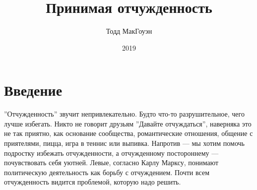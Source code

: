 \documentclass[11pt]{book}
\title{Принимая отчужденность}
\author{Тодд МакГоуэн}
\date{2019}
\begin{document}

\null
    \thispagestyle{empty}%
    \addtocounter{page}{-1}%
    \newpage

\tableofcontents

\chapter{Введение}

''Отчужденность'' звучит непривлекательно. Будто что-то разрушительное, чего лучше избегать. Никто не говорит друзьям ''Давайте отчуждаться'', наверняка это не так приятно, как основание сообщества, романтические отношения, общение с приятелями, пицца, игра в теннис или выпивка. Напротив --- мы хотим помочь подростку избежать отчужденности, а отчужденному постороннему --- почувствовать себя уютней. Левые, согласно Карлу Марксу, понимают политическую деятельность как борьбу с отчуждением. Почти всем отчужденность видится проблемой, которую надо решить.
\end{document}
